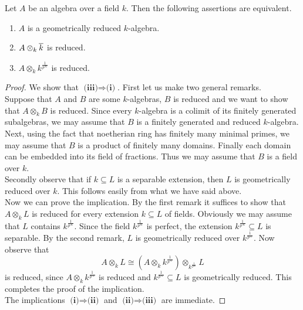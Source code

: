 \begin{proposition}\label{proposition:characterization_of_geometrically_reduced_algebras}
Let $A$ be an algebra over a field $k$. Then the following assertions are equivalent.
\begin{enumerate}[label=\emph{\textbf{(\roman*)}}, leftmargin=3.0em]
\item $A$ is a geometrically reduced $k$-algebra.
\item $A\otimes_k\overline{k}$ is reduced.
\item $A\otimes_kk^{\frac{1}{p^{\infty}}}$ is reduced.
\end{enumerate}
\end{proposition}
\begin{proof}
We show that $\textbf{(iii)}\Rightarrow \textbf{(i)}$. First let us make two general remarks.\\
Suppose that $A$ and $B$ are some $k$-algebras, $B$ is reduced and we want to show that $A\otimes_kB$ is reduced. Since every $k$-algebra is a colimit of its finitely generated subalgebras, we may assume that $B$ is a finitely generated and reduced $k$-algebra. Next, using the fact that noetherian ring has finitely many minimal primes, we may assume that $B$ is a product of finitely many domains. Finally each domain can be embedded into its field of fractions. Thus we may assume that $B$ is a field over $k$.\\
Secondly observe that if $k\subseteq L$ is a separable extension, then $L$ is geometrically reduced over $k$. This follows easily from what we have said above.\\
Now we can prove the implication. By the first remark it suffices to show that $A\otimes_kL$ is reduced for every extension $k\subseteq L$ of fields. Obviously we may assume that $L$ contains $k^{\frac{1}{p^{\infty}}}$. Since the field $k^{\frac{1}{p^{\infty}}}$ is perfect, the extension $k^{\frac{1}{p^{\infty}}}\subseteq L$ is separable. By the second remark, $L$ is geometrically reduced over $k^{\frac{1}{p^{\infty}}}$. Now observe that
$$A\otimes_kL\cong (A\otimes_kk^{\frac{1}{p^{\infty}}})\otimes_{k^{\frac{1}{p^{\infty}}}}L$$
is reduced, since $A\otimes_kk^{\frac{1}{p^{\infty}}}$ is reduced and $k^{\frac{1}{p^{\infty}}}\subseteq L$ is geometrically reduced. This completes the proof of the implication.\\
The implications $\textbf{(i)}\Rightarrow \textbf{(ii)}$ and $\textbf{(ii)}\Rightarrow \textbf{(iii)}$ are immediate.
\end{proof}




































